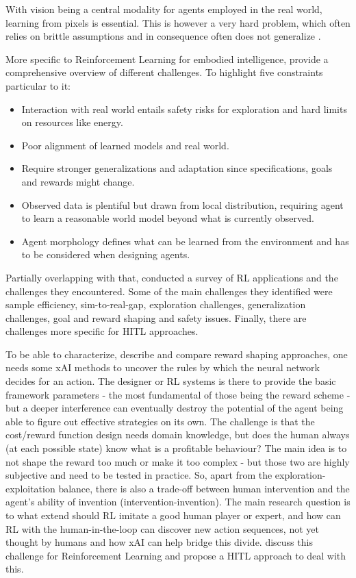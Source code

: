 \documentclass[twoside,11pt]{article}
\begin{document}
With vision being a central modality for agents employed in the real world, learning from pixels is essential. This is however a very hard problem, which often relies on brittle assumptions and in consequence often does not generalize \citet{TomarEtAl:2021:LearnPixelControlRepresentations}.


More specific to Reinforcement Learning for embodied intelligence, \citet{RoyEtAl:2021:RLRoboticsChallenges} provide a comprehensive overview of different challenges. To highlight five constraints particular to it:
\begin{itemize}
    \item Interaction with real world entails safety risks for exploration and hard limits on resources like energy.
    \item Poor alignment of learned models and real world.
    \item Require stronger generalizations  and adaptation since specifications, goals and rewards might change.
    \item Observed data is plentiful but drawn from local distribution, requiring agent to learn a reasonable world model beyond  what is currently observed. 
    \item Agent morphology defines what can be learned from the environment and has to be considered when designing agents.
\end{itemize}

Partially overlapping with that, \citet{ibarz2021train} conducted a survey of RL applications and the challenges they encountered. Some of the main challenges they identified were sample efficiency, sim-to-real-gap, exploration challenges, generalization challenges, goal and reward shaping and safety issues. Finally, there are challenges more specific for HITL approaches. 

To be able to characterize, describe and compare reward shaping approaches, one needs some xAI methods to uncover the rules by which the neural network decides for an action. The designer or RL systems is there to provide the basic framework parameters - the most fundamental of those being the reward scheme - but a deeper interference can eventually destroy the potential of the agent being able to figure out effective strategies on its own. The challenge is that the cost/reward function design needs domain knowledge, but does the human always (at each possible state) know what is a profitable behaviour? The main idea is to not shape the reward too much or make it too complex - but those two are highly subjective and need to be tested in practice. So, apart from the exploration-exploitation balance, there is also a trade-off between human intervention and the agent's ability of invention (intervention-invention). The main research question is to what extend should RL imitate a good human player or expert, and how can RL with the human-in-the-loop can discover new action sequences, not yet thought by humans and how xAI can help bridge this divide. \citet{LeeSmithAbbeel:2021:FeedbackPreferenceHITLLearningPEBBLE} discuss this challenge for Reinforcement Learning and propose a HITL approach to deal with this.
\end{document}
